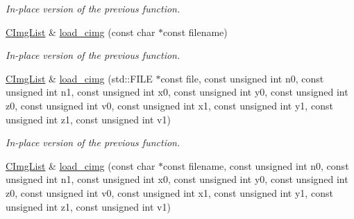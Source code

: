 \begin{DoxyCompactItemize}
\begin{DoxyCompactList}\small\item\em In-\/place version of the previous function. \end{DoxyCompactList}\item 
\hypertarget{structcimg__library_1_1_c_img_list_a2760a04dfde9a68e20a7a391793c5eee}{\hyperlink{structcimg__library_1_1_c_img_list}{C\-Img\-List} \& \hyperlink{structcimg__library_1_1_c_img_list_a2760a04dfde9a68e20a7a391793c5eee}{load\-\_\-cimg} (const char $\ast$const filename)}\label{structcimg__library_1_1_c_img_list_a2760a04dfde9a68e20a7a391793c5eee}

\begin{DoxyCompactList}\small\item\em In-\/place version of the previous function. \end{DoxyCompactList}\item 
\hypertarget{structcimg__library_1_1_c_img_list_aec1397f31a76d739706fbff7ef71c807}{\hyperlink{structcimg__library_1_1_c_img_list}{C\-Img\-List} \& \hyperlink{structcimg__library_1_1_c_img_list_aec1397f31a76d739706fbff7ef71c807}{load\-\_\-cimg} (std\-::\-F\-I\-L\-E $\ast$const file, const unsigned int n0, const unsigned int n1, const unsigned int x0, const unsigned int y0, const unsigned int z0, const unsigned int v0, const unsigned int x1, const unsigned int y1, const unsigned int z1, const unsigned int v1)}\label{structcimg__library_1_1_c_img_list_aec1397f31a76d739706fbff7ef71c807}

\begin{DoxyCompactList}\small\item\em In-\/place version of the previous function. \end{DoxyCompactList}\item 
\hypertarget{structcimg__library_1_1_c_img_list_a2f390af9942ef2d781445bce056a7189}{\hyperlink{structcimg__library_1_1_c_img_list}{C\-Img\-List} \& \hyperlink{structcimg__library_1_1_c_img_list_a2f390af9942ef2d781445bce056a7189}{load\-\_\-cimg} (const char $\ast$const filename, const unsigned int n0, const unsigned int n1, const unsigned int x0, const unsigned int y0, const unsigned int z0, const unsigned int v0, const unsigned int x1, const unsigned int y1, const unsigned int z1, const unsigned int v1)}\label{structcimg__library_1_1_c_img_list_a2f390af9942ef2d781445bce056a7189}


\end{DoxyCompactItemize}
